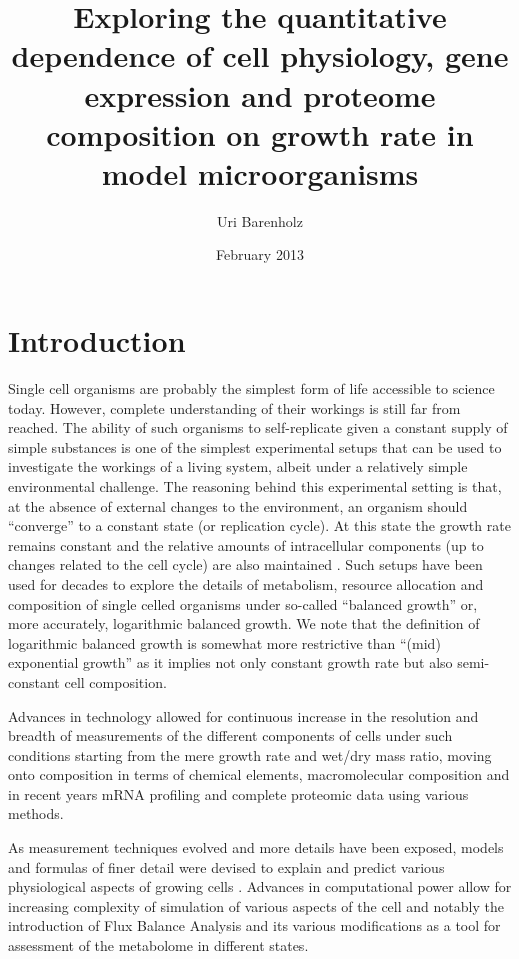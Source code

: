 \documentclass{report}
\title{Exploring the quantitative dependence of cell physiology, gene expression and proteome composition on growth rate in model microorganisms}
\author{Uri Barenholz}
\date{February 2013}
\begin{document}
\maketitle
\tableofcontents

\section{Introduction}
Single cell organisms are probably the simplest form of life accessible to science today.
However, complete understanding of their workings is still far from reached.
The ability of such organisms to self-replicate given a constant supply of simple substances is one of the simplest experimental setups that can be used to investigate the workings of a living system, albeit under a relatively simple environmental challenge.
The reasoning behind this experimental setting is that, at the absence of external changes to the environment, an organism should “converge” to a constant state (or replication cycle).
At this state the growth rate remains constant and the relative amounts of intracellular components (up to changes related to the cell cycle) are also maintained \cite{Campbell1957}.
Such setups have been used for decades \cite{Schaechter1958,Maaloe1969,Pedersen1978a} to explore the details of metabolism, resource allocation and composition of single celled organisms under so-called “balanced growth” or, more accurately, logarithmic balanced growth.
We note that the definition of logarithmic balanced growth is somewhat more restrictive than “(mid) exponential growth” as it implies not only constant growth rate but also semi-constant cell composition.

Advances in technology allowed for continuous increase in the resolution and breadth of measurements of the different components of cells under such conditions starting from the mere growth rate and wet/dry mass ratio, moving onto composition in terms of chemical elements, macromolecular composition and in recent years mRNA profiling and complete proteomic data using various methods.

As measurement techniques evolved and more details have been exposed, models and formulas of finer detail were devised to explain and predict various physiological aspects of growing cells \cite{Lerman2012,Karr2012}.
Advances in computational power allow for increasing complexity of simulation of various aspects of the cell and notably the introduction of Flux Balance Analysis and its various modifications as a tool for assessment of the metabolome in different states.
\end{document}
